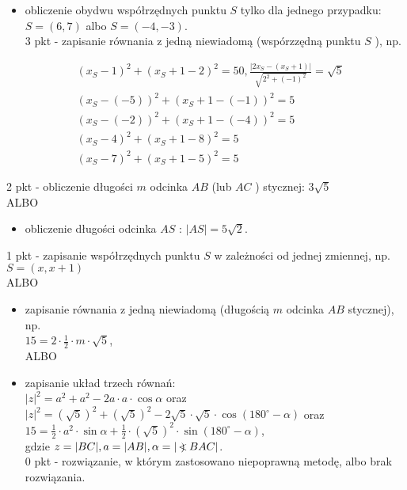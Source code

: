\documentclass[10pt]{article}
\newcommand\Varangle{\mathop{{<\!\!\!\!\!\text{\small)}}\:}\nolimits}
\begin{document}
\begin{itemize}
  \item obliczenie obydwu współrzędnych punktu $S$ tylko dla jednego przypadku: $S=(6,7)$ albo $S=(-4,-3)$.\\
3 pkt - zapisanie równania z jedną niewiadomą (wspórzzędną punktu $S$ ), np.
\end{itemize}

$$
\begin{aligned}
& \left(x_{S}-1\right)^{2}+\left(x_{S}+1-2\right)^{2}=50, \frac{\left|2 x_{S}-\left(x_{S}+1\right)\right|}{\sqrt{2^{2}+(-1)^{2}}}=\sqrt{5} \\
& \left(x_{S}-(-5)\right)^{2}+\left(x_{S}+1-(-1)\right)^{2}=5 \\
& \left(x_{S}-(-2)\right)^{2}+\left(x_{S}+1-(-4)\right)^{2}=5 \\
& \left(x_{S}-4\right)^{2}+\left(x_{S}+1-8\right)^{2}=5 \\
& \left(x_{S}-7\right)^{2}+\left(x_{S}+1-5\right)^{2}=5
\end{aligned}
$$

2 pkt - obliczenie długości $m$ odcinka $A B$ (lub $A C$ ) stycznej: $3 \sqrt{5}$\\
ALBO

\begin{itemize}
  \item obliczenie długości odcinka $A S$ : $|A S|=5 \sqrt{2}$.
\end{itemize}

1 pkt - zapisanie współrzędnych punktu $S$ w zależności od jednej zmiennej, np.\\
$S=(x, x+1)$\\
ALBO

\begin{itemize}
  \item zapisanie równania z jedną niewiadomą (długością $m$ odcinka $A B$ stycznej), np.\\
$15=2 \cdot \frac{1}{2} \cdot m \cdot \sqrt{5}$,\\
ALBO
  \item zapisanie układ trzech równań:\\
$|z|^{2}=a^{2}+a^{2}-2 a \cdot a \cdot \cos \alpha$ oraz\\
$|z|^{2}=(\sqrt{5})^{2}+(\sqrt{5})^{2}-2 \sqrt{5} \cdot \sqrt{5} \cdot \cos \left(180^{\circ}-\alpha\right)$ oraz\\
$15=\frac{1}{2} \cdot a^{2} \cdot \sin \alpha+\frac{1}{2} \cdot(\sqrt{5})^{2} \cdot \sin \left(180^{\circ}-\alpha\right)$,\\
gdzie $z=|B C|, a=|A B|, \alpha=|\Varangle B A C|$.\\
0 pkt - rozwiązanie, w którym zastosowano niepoprawną metodę, albo brak rozwiązania.
\end{itemize}
\end{document}
